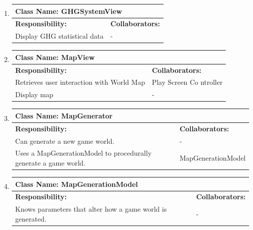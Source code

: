 \documentclass[]{article}
\begin{document}
\begin{enumerate}[1.]
\begin{tabular}{|p{10cm}|p{4cm}|}
	    \hline
	  \end{tabular}

	\item
	\begin{tabular}{|p{10cm}|p{4cm}|}
	    \hline
	     \multicolumn{2}{|l|}{\textbf{Class Name:  GHGSystemView}} \\
	    \hline
	    \textbf{Responsibility:} & \textbf{Collaborators:} \\
	    \hline
	    Display GHG statistical data & - \\

	    \hline
	  \end{tabular}

	\item
	\begin{tabular}{|p{10cm}|p{4cm}|}
	    \hline
	     \multicolumn{2}{|l|}{\textbf{Class Name:  MapView}} \\
	    \hline
	    \textbf{Responsibility:} & \textbf{Collaborators:} \\
	    \hline
	    Retrieves user interaction with World Map & Play Screen Co ntroller \\
	Display map & - \\

	    \hline
	  \end{tabular}

	\item
	\begin{tabular}{|p{10cm}|p{4cm}|}
	    \hline
	     \multicolumn{2}{|l|}{\textbf{Class Name:  MapGenerator}} \\
	    \hline
	    \textbf{Responsibility:} & \textbf{Collaborators:} \\
	    \hline
	    Can generate a new game world. & - \\
	Uses a MapGenerationModel to procedurally generate a game world. & MapGenerationModel \\

	    \hline
	  \end{tabular}

	\item
	\begin{tabular}{|p{10cm}|p{4cm}|}
	    \hline
	     \multicolumn{2}{|l|}{\textbf{Class Name:  MapGenerationModel}} \\
	    \hline
	    \textbf{Responsibility:} & \textbf{Collaborators:} \\
	    \hline
	    Knows parameters that alter how a game world is generated. & - \\


\end{tabular}
\end{enumerate}
\end{document}
